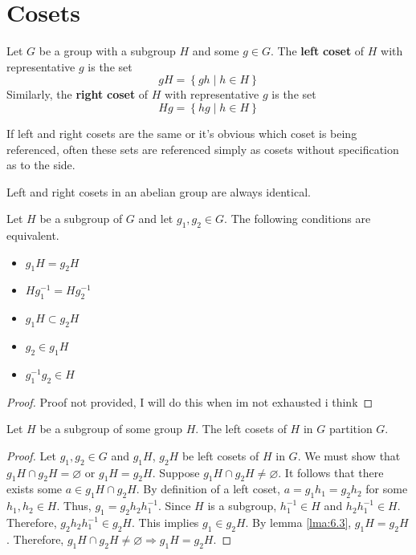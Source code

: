 \documentclass[12pt, letterpaper]{report}
\begin{document}
\section{Cosets}
\begin{definition}[Cosets]
	Let \(G\) be a group with a subgroup \(H\) and some \(g\in G\). The \textbf{left} \textbf{coset} of \(H\) with representative \(g\) is the set
	\[
		gH = \left\{ gh \mid h\in H \right\} 
\]
Similarly, the \textbf{right} \textbf{coset} of \(H\) with representative \(g\) is the set
\[
	Hg = \left\{ hg \mid h\in H \right\} 
\]
\end{definition}
If left and right cosets are the same or it's obvious which coset is being referenced, often these sets are referenced simply as cosets without specification as to the side.
\begin{proposition}
	Left and right cosets in an abelian group are always identical.
\end{proposition}
\begin{lemma}\label{lma:6.3}
	Let \(H\) be a subgroup of \(G\) and let \(g_1,g_2\in G\). The following conditions are equivalent.
	\begin{itemize}
		\item \(g_1 H=g_2 H\)
		\item \(H g^{-1} _1=H g^{-1} _2\)
		\item \(g_1 H \subset g_2 H\)
		\item \(g_2\in g_1 H\)
		\item \(g^{-1} _1 g_2 \in H\)
	\end{itemize}
\end{lemma}
\begin{proof}
	Proof not provided, I will do this when im not exhausted i think
\end{proof}
\begin{theorem}\label{cospart}
	Let \(H\) be a subgroup of some group \(H\). The left cosets of \(H\) in \(G\) partition \(G\).
\end{theorem}
\begin{proof}
	Let \(g_1,g_2\in G\) and \(g_1 H\), \(g_2 H\) be left cosets of \(H\) in \(G\). We must show that \(g_1 H \cap g_2 H = \varnothing \) or \(g_1 H = g_2 H\). Suppose \(g_1 H \cap g_2 H \neq \varnothing \). It follows that there exists some \(a\in g_1 H \cap g_2 H\). By definition of a left coset, \(a=g_1 h_1 = g_2 h_2\) for some \(h_1,h_2\in H\). Thus, \(g_1 =g_2 h_2 h^{-1} _1\). Since \(H\) is a subgroup, \(h^{-1} _1\in H\) and \(h_2 h^{-1} _1 \in H\). Therefore, \(g_2 h_2 h^{-1} _1 \in g_2 H\). This implies \(g_1\in g_2 H\). By lemma \ref{lma:6.3}, \(g_1 H = g_2 H\). Therefore, \(g_1 H\cap g_2 H \neq \varnothing \Longrightarrow g_1 H = g_2 H \).
\end{proof}
\end{document}
